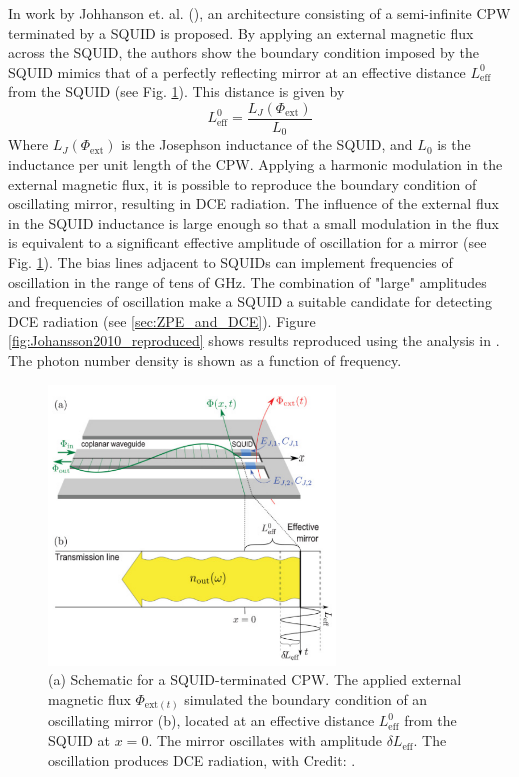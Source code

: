 In work by Johhanson et. al. (\cite{Johansson2009, Johansson2010}), an architecture consisting of a semi-infinite CPW terminated by a SQUID is proposed. By applying an external magnetic flux across the SQUID, the authors show the boundary condition imposed by the SQUID mimics that of a perfectly reflecting mirror at an effective distance $L^0_{\text{eff}}$ from the SQUID (see Fig. \ref{fig:Johansson2010_effectivemirror}). This distance is given by
%
\begin{equation}\label{eq:squid_inductance}
    L^0_{\text{eff}} = \frac{L_J(\Phi_{\text{ext}})}{L_0}
\end{equation}
%
Where $L_J(\Phi_{\text{ext}})$ is the Josephson inductance of the SQUID, and $L_0$ is the inductance per unit length of the CPW. Applying a harmonic modulation in the external magnetic flux, it is possible to reproduce the boundary condition of oscillating mirror, resulting in DCE radiation. The influence of the external flux in the SQUID inductance is large enough so that a small modulation in the flux is equivalent to a significant effective amplitude of oscillation for a mirror (see Fig. \ref{fig:Johansson2010_effectivemirror}). The bias lines adjacent to SQUIDs can implement frequencies of oscillation in the range of tens of GHz. The combination of "large" amplitudes and frequencies of oscillation make a SQUID a suitable candidate for detecting DCE radiation (see \ref{sec:ZPE_and_DCE}). Figure \ref{fig:Johansson2010_reproduced} shows results reproduced using the analysis in \cite{Johansson2010}. The photon number density is shown as a function of frequency.
%
\begin{figure}
    \centering
    \includegraphics[width=3in, keepaspectratio]{figures/intro/Johansson2010_effectivemirror.png}
    \caption{(a) Schematic for a SQUID-terminated CPW. The applied external magnetic flux $\Phi_{\text{ext}(t)}$ simulated the boundary condition of an oscillating mirror (b), located at an effective distance $L^0_{\text{eff}}$ from the SQUID at $x=0$. The mirror oscillates with amplitude $\delta L_{\text{eff}}$. The oscillation produces DCE radiation, with  Credit: \protect\cite{Johansson2010}.}
    \label{fig:Johansson2010_effectivemirror}
\end{figure}


